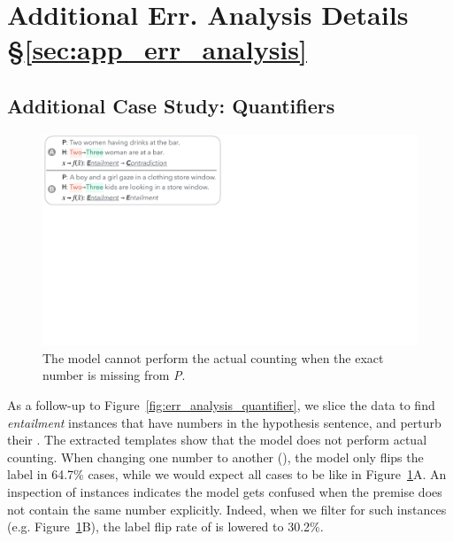 \section{Additional Err. Analysis Details \S\ref{sec:app_err_analysis}}
\label{appendix:err_analysis}

\subsection{Additional Case Study: Quantifiers}
\label{appendix:err_analysis_quantifier_case}

\begin{figure}[t]
\centering
\includegraphics[trim={0 25.2cm 34.5cm 0cm},clip,width=1\columnwidth]{figures/err_analysis_two_three}
\vspace{-20pt}
\caption{
The \nli model cannot perform the actual counting when the exact number is missing from \emph{P}.
}
\vspace{-10pt}
\label{fig:err_analysis_two_three}
\end{figure}



As a follow-up to Figure~\ref{fig:err_analysis_quantifier}, we slice the data to find \emph{entailment} instances that have numbers in the hypothesis sentence, and perturb their .
The extracted templates show that the model does not perform actual counting. 
When changing one number to another (), the model only flips the label in 64.7\% cases, while we would expect all cases to be like in Figure~\ref{fig:err_analysis_two_three}A.
An inspection of instances indicates the model gets confused when the premise does not contain the same number explicitly. 
Indeed, when we filter for such instances (e.g. Figure~\ref{fig:err_analysis_two_three}B), the label flip rate of  is lowered to 30.2\%.

